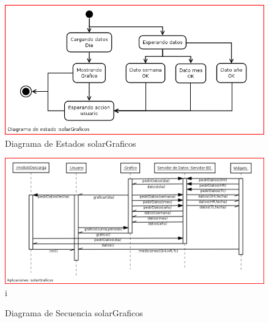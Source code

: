{\begin{figure}[h!]
        \centering
        \includegraphics[scale=0.4]{images/graficosEstados}
        \caption{Diagrama de Estados solarGraficos}
        \label{solarGraficoE}
\end{figure}
\begin{figure}[h!]
        \centering
        \includegraphics[scale=0.4]{images/graficosSecuencia}i
        \caption{Diagrama de Secuencia solarGraficos}
        \label{solarGraficoS}
\end{figure}

}
